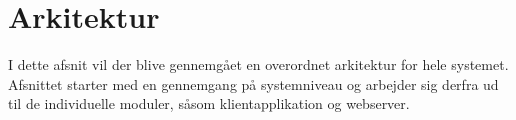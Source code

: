 \chapter{Arkitektur}
I dette afsnit vil der blive gennemgået en overordnet arkitektur for hele systemet. Afsnittet starter med en gennemgang på systemniveau og arbejder sig derfra ud til de individuelle moduler, såsom klientapplikation og webserver.